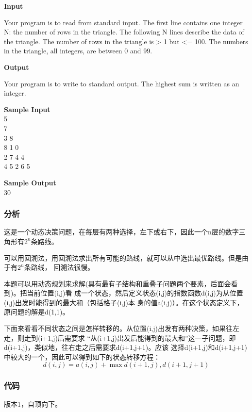 \textbf{Input}

Your program is to read from standard input. The first line contains one integer N: the 
number of rows in the triangle. The following N lines describe the data of the triangle. 
The number of rows in the triangle is > 1 but <= 100. The numbers in the triangle, 
all integers, are between 0 and 99.

\textbf{Output}

Your program is to write to standard output. The highest sum is written as an integer.

\textbf{Sample Input} \\
5 \\
7 \\
3 8 \\
8 1 0  \\
2 7 4 4 \\
4 5 2 6 5

\textbf{Sample Output} \\
30

\subsubsection{分析}
这是一个动态决策问题，在每层有两种选择，左下或右下，因此一个n层的数字三角形有$2^n$条路线。

可以用回溯法，用回溯法求出所有可能的路线，就可以从中选出最优路线。但是由于有$2^n$条路线，
回溯法很慢。

本题可以用动态规划来求解(具有最有子结构和重叠子问题两个要素，后面会看到)。把当前位置(i,j)看
成一个状态，然后定义状态(i,j)的指数函数d(i,j)为从位置(i,j)出发时能得到的最大和（包括格子(i,j)本
身的值a(i,j)）。在这个状态定义下，原问题的解是d(1,1)。

下面来看看不同状态之间是怎样转移的。从位置(i,j)出发有两种决策，如果往左走，则走到(i+1,j)后需要求
“从(i+1,j)出发后能得到的最大和”这一子问题，即d(i+1,j)，类似地，往右走之后需要求d(i+1,j+1)。应该
选择d(i+1,j)和d(i+1,j+1)中较大的一个，因此可以得到如下的状态转移方程：
$$d(i,j)=a(i,j)+\max{d(i+1,j), d(i+1,j+1)}$$

\subsubsection{代码}
版本1，自顶向下。

